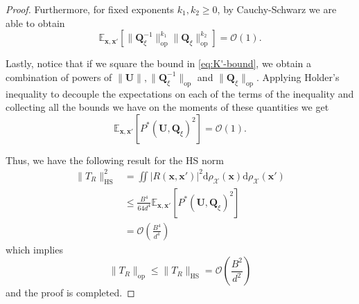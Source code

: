 \begin{proof}
    Furthermore, for fixed exponents $k_1, k_2 \geq 0$, by Cauchy-Schwarz we are able to obtain
    \[
        \mathbb E_{\bm x, \bm x'}\left[\|\bm Q_{\xi}^{-1}\|_{\text{op}}^{k_1}\|\bm Q_{\xi}\|_{\text{op}}^{k_2}\right] = \mathcal O(1).
    \]    
    
    Lastly, notice that if we square the bound in \ref{eq:K'-bound}, we obtain a combination of powers of $\|\bm U\|, \|\bm Q_{\xi}^{-1}\|_{\text{op}}$ and $\|\bm Q_{\xi}\|_{\text{op}}$. Applying Holder's inequality to decouple the expectations on each of the terms of the inequality and collecting all the bounds we have on the moments of these quantities we get
    \[
        \mathbb E_{\bm x, \bm x'}[P^*(\bm U, \bm Q_\xi)^2] = \mathcal O(1).
    \]
    
    Thus, we have the following result for the HS norm
    \begin{align*}
        \|T_R\|_{\text{HS}}^2 &= \iint |R(\bm x, \bm x')|^2\mathrm d \rho_{\mathcal X}(\bm x)\mathrm d \rho_{\mathcal X}(\bm x')\\
        &\leq  \frac{B^4}{64d^4} \mathbb E_{\bm x, \bm x'}[P^*(\bm U, \bm Q_{\xi})^2]\\
        &=\mathcal O\left(\frac{B^4}{d^4}\right)
    \end{align*}
    which implies
    \[
        \| T_R\|_{\text{op}} \leq \|T_R\|_{\text{HS}} = \mathcal O\left(\frac{B^2}{d^2}\right)
    \]
    and the proof is completed.
\end{proof}
